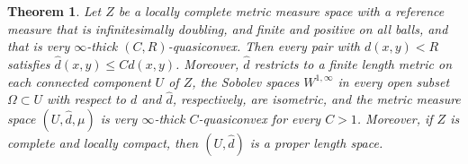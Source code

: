 \documentclass[reqno]{amsart}
\numberwithin{equation}{section}
\newtheorem{theorem}{Theorem}[section]
\theoremstyle{remark}
\begin{document}
\begin{theorem}\label{thm:essentialdistance}
Let $Z$ be a locally complete metric measure space with a reference measure that is infinitesimally doubling, and finite and positive on all balls, and that is very $\infty$-thick $(C,R)$-quasiconvex. Then every pair with $d(x,y) < R$ satisfies $\widehat{d}(x,y) \leq C d(x,y)$. Moreover, $\widehat{d}$ restricts to a finite length metric on each connected component $U$ of $Z$, the Sobolev spaces $W^{1,\infty}$ in every open subset $\Omega \subset U$ with respect to $d$ and $\widehat{d}$, respectively, are isometric, and the metric measure space $( U, \widehat{d}, \mu )$ is very $\infty$-thick $C$-quasiconvex for every $C>1$. Moreover, if $Z$ is complete and locally compact, then $( U, \widehat{d} )$ is a proper length space.
\end{theorem}
\end{document}

